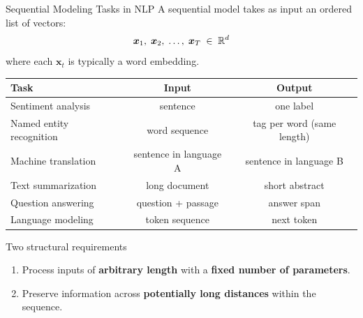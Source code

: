 \documentclass[aspectratio=169]{beamer}
\begin{document}
\begin{frame}{Sequential Modeling Tasks in NLP}
A sequential model takes as input an ordered list of vectors:
\[
\bm{x}_1,\; \bm{x}_2,\; \ldots,\; \bm{x}_T \;\in\; \mathbb{R}^{d}
\]
where each $\bm{x}_t$ is typically a word embedding.

\vspace{0.15cm}
\begin{center}
\renewcommand{\arraystretch}{1.25}
\begin{tabular}{lcc}
\toprule
\textbf{Task} & \textbf{Input} & \textbf{Output} \\
\midrule
Sentiment analysis & sentence & one label \\
Named entity recognition & word sequence & tag per word (same length) \\
Machine translation & sentence in language A & sentence in language B \\
Text summarization & long document & short abstract \\
Question answering & question + passage & answer span \\
Language modeling & token sequence & next token \\
\bottomrule
\end{tabular}
\end{center}

\vspace{0.15cm}
\begin{block}{Two structural requirements}
\begin{enumerate}
    \item Process inputs of \textbf{arbitrary length} with a \textbf{fixed number of parameters}.
    \item Preserve information across \textbf{potentially long distances} within the sequence.
\end{enumerate}
\end{block}
\end{frame}
%
\end{document}
